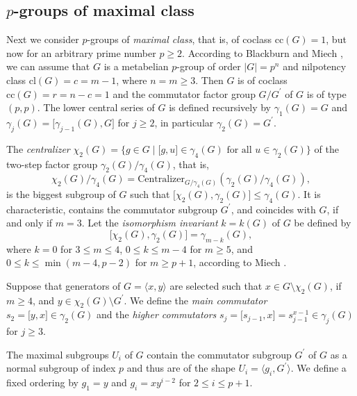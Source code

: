 \documentclass{amsart}
\theoremstyle{definition}
\numberwithin{equation}{section}
\begin{document}
\subsection{\(p\)-groups of maximal class}
\label{ss:MaxClass}

Next we consider \(p\)-groups of \textit{maximal class}, that is, of coclass \(\mathrm{cc}(G)=1\),
but now for an arbitrary prime number \(p\ge 2\).
According to Blackburn
\cite{Bl}
and Miech
\cite{Mi},
we can assume that \(G\) is a metabelian \(p\)-group
of order \(\lvert G\rvert=p^n\) and
nilpotency class \(\mathrm{cl}(G)=c=m-1\), where \(n=m\ge 3\).
Then \(G\) is of coclass \(\mathrm{cc}(G)=r=n-c=1\)
and the commutator factor group \(G/G^\prime\) of \(G\) is of type \((p,p)\).
The lower central series of \(G\) is defined
recursively by \(\gamma_1(G)=G\) and
\(\gamma_j(G)=\lbrack\gamma_{j-1}(G),G\rbrack\) for \(j\ge 2\),
in particular \(\gamma_2(G)=G^\prime\).

The \textit{centralizer}
\(\chi_2(G)
=\lbrace g\in G\mid\lbrack g,u\rbrack\in\gamma_4(G)\text{ for all }u\in\gamma_2(G)\rbrace\)
of the two-step factor group \(\gamma_2(G)/\gamma_4(G)\), that is,
\[\chi_2(G)/\gamma_4(G)
=\mathrm{Centralizer}_{G/\gamma_4(G)}(\gamma_2(G)/\gamma_4(G)),\]
is the biggest subgroup of \(G\) such that
\(\lbrack\chi_2(G),\gamma_2(G)\rbrack\le\gamma_4(G)\).
It is characteristic, contains the commutator subgroup \(G^\prime\), and
coincides with \(G\), if and only if \(m=3\).
Let the \textit{isomorphism invariant} \(k=k(G)\) of \(G\) be defined by
\[\lbrack\chi_2(G),\gamma_2(G)\rbrack=\gamma_{m-k}(G),\]
where \(k=0\) for \(3\le m\le 4\), \(0\le k\le m-4\) for \(m\ge 5\),
and \(0\le k\le\min(m-4,p-2)\) for \(m\ge p+1\),
according to Miech
\cite[p.331]{Mi}.

Suppose that generators of \(G=\langle x,y\rangle\) are selected such that
\(x\in G\setminus\chi_2(G)\), if \(m\ge 4\), and \(y\in\chi_2(G)\setminus G^\prime\).
We define the \textit{main commutator}
\(s_2=\lbrack y,x\rbrack\in\gamma_2(G)\)
and the \textit{higher commutators}
\(s_j=\lbrack s_{j-1},x\rbrack=s_{j-1}^{x-1}\in\gamma_j(G)\) for \(j\ge 3\).

The maximal subgroups \(U_i\) of \(G\)
contain the commutator subgroup \(G^\prime\) of \(G\)
as a normal subgroup of index \(p\) and thus
are of the shape \(U_i=\langle g_i,G^\prime\rangle\).
We define a fixed ordering by
\(g_1=y\) and \(g_i=xy^{i-2}\) for \(2\le i\le p+1\).
\end{document}
